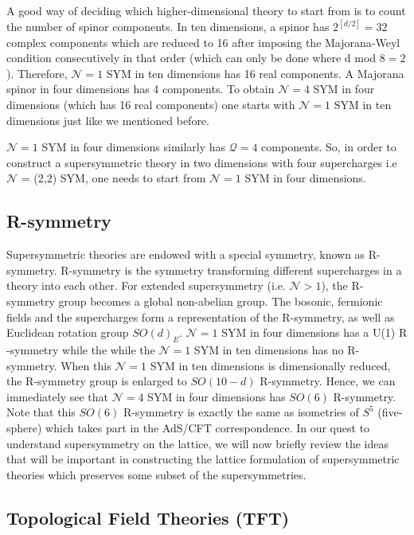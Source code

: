 A good way of deciding which higher-dimensional theory to start from is to count the number of spinor components.  
In ten dimensions, a spinor has $2^{[d/2]} = 32$ complex components which are reduced to 16 after imposing the 
Majorana-Weyl condition consecutively in that order (which can only be done where d mod $8 = 2$). 
Therefore, $\mathcal{N}=1$ SYM in ten dimensions has 16 real components. 
A Majorana spinor in four dimensions has 4 components. To obtain
$\mathcal{N}=4$ SYM in four dimensions (which has 16 real components) 
one starts with $\mathcal{N}=1$ SYM in ten dimensions just like we mentioned before. 

$\mathcal{N}=1$ SYM in four dimensions similarly has $\mathcal{Q}=4$ components. 
So, in order to construct a supersymmetric theory in two dimensions with four supercharges i.e $\mathcal{N}$ = (2,2) SYM, 
one needs to start from $\mathcal{N}=1$ SYM in four dimensions. 


\subsection{R-symmetry} 

Supersymmetric theories are endowed with a special symmetry, known as R-symmetry. 
R-symmetry is the symmetry transforming different supercharges in a theory into each other. 
For extended supersymmetry (i.e. $\mathcal{N} > 1$), the R-symmetry group becomes a 
global non-abelian group. The bosonic, fermionic fields and the supercharges form a representation of the 
R-symmetry, as well as Euclidean rotation group $SO(d)_{E}$.
$\mathcal{N}=1$ SYM in four dimensions has a U(1) R
-symmetry while the while the $\mathcal{N}=1$
SYM in ten dimensions has no R-symmetry. 
When this $\mathcal{N}=1$ SYM in ten dimensions is dimensionally reduced, 
the R-symmetry group is enlarged to $SO(10-d)$ R-symmetry. Hence, we can immediately 
see that $\mathcal{N}=4$ SYM in four dimensions has $SO(6)$ R-symmetry.
Note that this $SO(6)$ R-symmetry is exactly the same as isometries of $S^{5}$ (five-sphere) 
which takes part in the AdS/CFT correspondence. 
In our quest to understand supersymmetry on the lattice, we will now briefly review
the ideas that will be important in constructing the lattice formulation of supersymmetric theories
which preserves some subset of the supersymmetries. 



\subsection{Topological Field Theories (TFT)}


